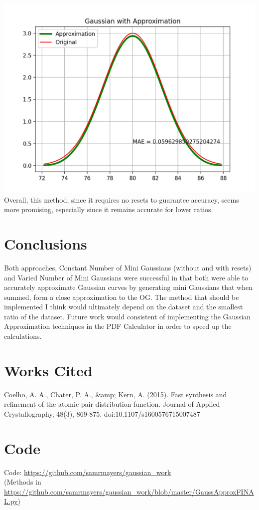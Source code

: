 \documentclass{article}
\begin{document}
\includegraphics[scale = .8]{varied_single.png} \\
Overall, this method, since it requires no resets to guarantee accuracy, seems more promising, especially since it remains accurate for lower ratios.

\section*{Conclusions}
Both approaches, Constant Number of Mini Gaussians (without and with resets) and Varied Number of Mini Gaussians were successful in that both were able to accurately approximate Gaussian curves by generating mini Gaussians that when summed, form a close approximation to the OG. The method that should be implemented I think would ultimately depend on the dataset and the smallest ratio of the dataset. Future work would consistent of implementing the Gaussian Approximation techniques in the PDF Calculator in order to speed up the calculations.

\section*{Works Cited}
Coelho, A. A., Chater, P. A., &amp; Kern, A. (2015). Fast synthesis and refinement of the atomic pair distribution function. Journal of Applied Crystallography, 48(3), 869-875. doi:10.1107/s1600576715007487 \\

\section*{Code}
Code: \href{https://github.com/samrmayers/gaussian_work}{https://github.com/samrmayers/gaussian_work} \\
(Methods in \href{https://github.com/samrmayers/gaussian_work/blob/master/GaussApproxFINAL.py}{https://github.com/samrmayers/gaussian_work/blob/master/GaussApproxFINAL.py})
\end{document}
